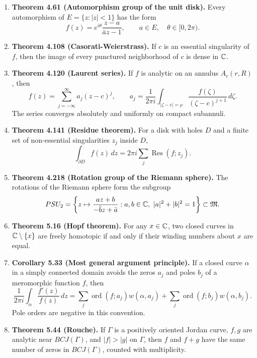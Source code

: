 \documentclass{article}
\newcommand{\Res}{\operatorname{Res}}
\providecommand{\Mob}{\mathfrak{M}}
\begin{document}
\begin{enumerate}
  \item \textbf{Theorem 4.61 (Automorphism group of the unit disk).}
  Every automorphism of $E=\{z:|z|<1\}$ has the form
  \[
    f(z)=e^{i\theta}\frac{z-a}{\bar a z-1},
    \qquad a\in E,\quad \theta\in[0,2\pi).
  \]

  \item \textbf{Theorem 4.108 (Casorati-Weierstrass).}
  If $c$ is an essential singularity of $f$, then the image of every
  punctured neighborhood of $c$ is dense in $\mathbb{C}$.

  \item \textbf{Theorem 4.120 (Laurent series).}
  If $f$ is analytic on an annulus $A_c(r,R)$, then
  \[
    f(z)=\sum_{j=-\infty}^{\infty}a_j(z-c)^j,\qquad
    a_j=\frac{1}{2\pi i}\int_{|\zeta-c|=\rho}
      \frac{f(\zeta)}{(\zeta-c)^{j+1}}\,d\zeta.
  \]
  The series converges absolutely and uniformly on compact subannuli.

  \item \textbf{Theorem 4.141 (Residue theorem).}
  For a disk with holes $D$ and a finite set of non-essential singularities
  $z_j$ inside $D$,
  \[
    \int_{\partial D}f(z)\,dz
    =2\pi i\sum_j \Res(f;z_j).
  \]

  \item \textbf{Theorem 4.218 (Rotation group of the Riemann sphere).}
  The rotations of the Riemann sphere form the subgroup
  \[
    PSU_2=\left\{
      z\mapsto\frac{az+b}{-\bar b z+\bar a}:
      a,b\in\C,\ |a|^2+|b|^2=1
    \right\}
    \subset \Mob.
  \]

  \item \textbf{Theorem 5.16 (Hopf theorem).}
  For any $x\in\mathbb{C}$, two closed curves in $\mathbb{C}\setminus\{x\}$ are freely
  homotopic if and only if their winding numbers about $x$ are equal.

  \item \textbf{Corollary 5.33 (Most general argument principle).}
  If a closed curve $\alpha$ in a simply connected domain avoids the zeros
  $a_j$ and poles $b_j$ of a meromorphic function $f$, then
  \[
    \frac{1}{2\pi i}\int_\alpha \frac{f'(z)}{f(z)}\,dz
    =
    \sum_j \operatorname{ord}(f;a_j)w(\alpha,a_j)
    +
    \sum_j \operatorname{ord}(f;b_j)w(\alpha,b_j).
  \]
  Pole orders are negative in this convention.

  \item \textbf{Theorem 5.44 (Rouche).}
  If $\Gamma$ is a positively oriented Jordan curve, $f,g$ are analytic near
  $BCJ(\Gamma)$, and $|f|>|g|$ on $\Gamma$, then $f$ and $f+g$ have the same
  number of zeros in $BCJ(\Gamma)$, counted with multiplicity.
\end{enumerate}
\end{document}
